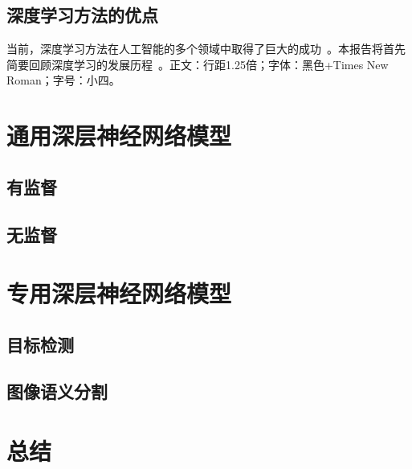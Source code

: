 \documentclass[a4paper, AutoFakeBold]{article}
\begin{document}
\subsection{深度学习方法的优点}
当前，深度学习方法在人工智能的多个领域中取得了巨大的成功~\cite{huang2017densely}。本报告将首先简要回顾深度学习的发展历程~\cite{marzano2007rainfall}。正文：行距1.25倍；字体：黑色+Times New Roman；字号：小四。
\section{通用深层神经网络模型}
\subsection{有监督}
\subsection{无监督}
\section{专用深层神经网络模型}
\subsection{目标检测}
\subsection{图像语义分割}
\section{总结}



\end{document}
